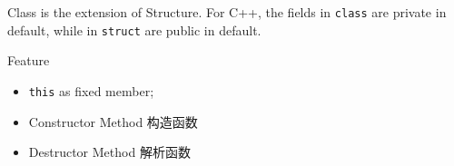 Class is the extension of Structure. For C++, the fields in \verb|class| are private in default, while in \verb|struct| are public in default.



Feature

\begin{itemize}

\item \verb|this| as fixed member;
\item Constructor Method 构造函数
\item Destructor Method 解析函数
\end{itemize}

